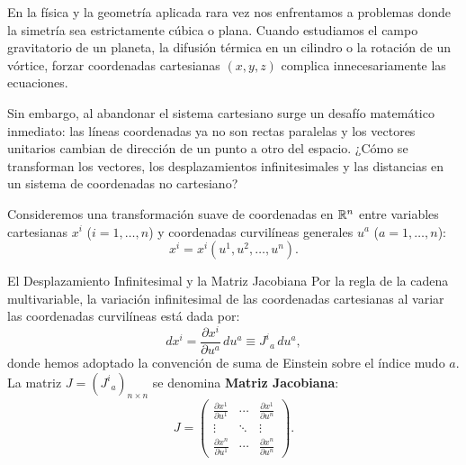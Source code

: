 \documentclass[11pt,letterpaper]{article}
\begin{document}
\setlength{\abovedisplayskip}{6pt}
\setlength{\belowdisplayskip}{6pt}
\setlength{\textfloatsep}{10pt}
\setlength{\intextsep}{8pt}
\color{blackmain}



En la física y la geometría aplicada rara vez nos enfrentamos a problemas donde la simetría sea estrictamente cúbica o plana. Cuando estudiamos el campo gravitatorio de un planeta, la difusión térmica en un cilindro o la rotación de un vórtice, forzar coordenadas cartesianas $(x, y, z)$ complica innecesariamente las ecuaciones.

Sin embargo, al abandonar el sistema cartesiano surge un desafío matemático inmediato: las líneas coordenadas ya no son rectas paralelas y los vectores unitarios cambian de dirección de un punto a otro del espacio. ¿Cómo se transforman los vectores, los desplazamientos infinitesimales y las distancias en un sistema de coordenadas no cartesiano?


Consideremos una transformación suave de coordenadas en $\mathbb{R}^n$ entre variables cartesianas $x^i$ ($i = 1, \dots, n$) y coordenadas curvilíneas generales $u^a$ ($a = 1, \dots, n$):
\[
x^i = x^i(u^1, u^2, \dots, u^n).
\]

\begin{intuitionbox}{El Desplazamiento Infinitesimal y la Matriz Jacobiana}
Por la regla de la cadena multivariable, la variación infinitesimal de las coordenadas cartesianas al variar las coordenadas curvilíneas está dada por:
\[
dx^i = \frac{\partial x^i}{\partial u^a}\,du^a \equiv J^i{}_a\,du^a,
\]
donde hemos adoptado la convención de suma de Einstein sobre el índice mudo $a$.
La matriz $J = (J^i{}_a)_{n\times n}$ se denomina \textbf{Matriz Jacobiana}:
\[
J = \begin{pmatrix} 
\frac{\partial x^1}{\partial u^1} & \cdots & \frac{\partial x^1}{\partial u^n} \\
\vdots & \ddots & \vdots \\
\frac{\partial x^n}{\partial u^1} & \cdots & \frac{\partial x^n}{\partial u^n}
\end{pmatrix}.
\]
\end{intuitionbox}
\end{document}
